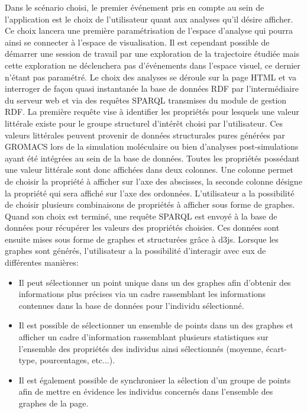 Dans le scénario choisi, le premier événement pris en compte au sein de l'application est le choix de l'utilisateur quant aux analyses qu'il désire afficher. Ce choix lancera une première paramétrisation de l'espace d'analyse qui pourra ainsi se connecter à l'espace de visualisation. 
Il est cependant possible de démarrer une session de travail par une exploration de la trajectoire étudiée mais cette exploration ne déclenchera pas d'événements dans l'espace visuel, ce dernier n'étant pas paramétré.
Le choix des analyses se déroule sur la page HTML et va interroger de façon quasi instantanée la base de données RDF par l'intermédiaire du serveur web et via des requêtes SPARQL transmises du module de gestion RDF. La première requête vise à identifier les propriétés pour lesquels une valeur littérale existe pour le groupe structurel d'intérêt choisi par l'utilisateur. Ces valeurs littérales peuvent provenir de données structurales pures générées par GROMACS lors de la simulation moléculaire ou bien d'analyses post-simulations ayant été intégrées au sein de la base de données. Toutes les propriétés possédant une valeur littérale sont donc affichées dans deux colonnes. Une colonne permet de choisir la propriété à afficher sur l'axe des abscisses, la seconde colonne désigne la propriété qui sera affiché sur l'axe des ordonnées. L'utilisateur a la possibilité de choisir plusieurs combinaisons de propriétés à afficher sous forme de graphes. Quand son choix est terminé, une requête SPARQL est envoyé à la base de données pour récupérer les valeurs des propriétés choisies. Ces données sont ensuite mises sous forme de graphes et structurées grâce à d3js.
Lorsque les graphes sont générés, l'utilisateur a la possibilité d'interagir avec eux de différentes manières: 
\begin{itemize}
	\item Il peut sélectionner un point unique dans un des graphes afin d'obtenir des informations plus précises via un cadre rassemblant les informations contenues dans la base de données pour l'individu sélectionné.
	\item Il est possible de sélectionner un ensemble de points dans un des graphes et afficher un cadre d'information rassemblant plusieurs statistiques sur l'ensemble des propriétés des individus ainsi sélectionnés (moyenne, écart-type, pourcentages, etc...).
	\item Il est également possible de synchroniser la sélection d'un groupe de points afin de mettre en évidence les individus concernés dans l'ensemble des graphes de la page.
\end{itemize}

